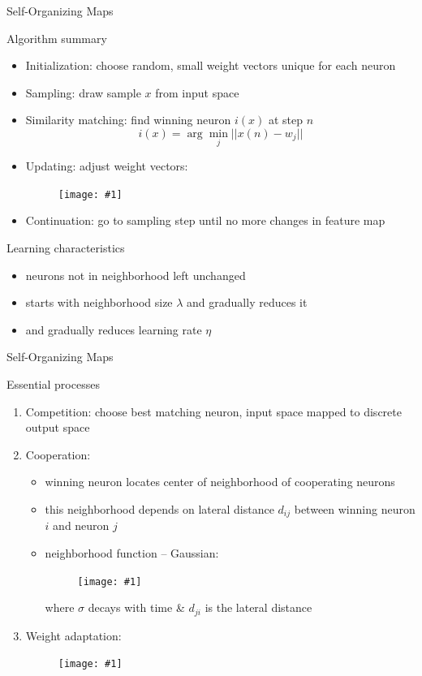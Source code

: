 \documentclass[9pt,t]{beamer}
\newcommand{\picEqHereWidth}[2] { %
    \begin{figure}[htp] 
        \centering
        \texttt{[image: \#1]}
    \end{figure}
}
\begin{document}
\begin{frame}{Self-Organizing Maps}
    \begin{alertblock}{Algorithm summary}
        \begin{itemize}
            \item Initialization: choose random, small weight vectors unique for each neuron
            \item Sampling: draw sample $ x $ from input space
            \item Similarity matching: find winning neuron $ i(x) $ at step $ n $
                \[ i(x) = \arg\min_j ||x(n) - w_j|| \]
            \item Updating: adjust weight vectors:
                \picEqHereWidth{som_weight_update}{0.5\linewidth}
            \item Continuation: go to sampling step until no more changes in feature map
        \end{itemize}
    \end{alertblock}
    \begin{alertblock}{Learning characteristics}
        \begin{itemize}
            \item neurons not in neighborhood left unchanged
            \item starts with neighborhood size $ \lambda $ and gradually reduces it
            \item and gradually reduces learning rate $ \eta $
        \end{itemize}
    \end{alertblock}
\end{frame}

\begin{frame}{Self-Organizing Maps}
    \begin{alertblock}{Essential processes}
        \begin{enumerate}
            \item Competition: choose best matching neuron, input space mapped to discrete output space
            \item Cooperation:
            \begin{itemize}
                \item winning neuron locates center of neighborhood of cooperating neurons
                \item this neighborhood depends on lateral distance $ d_{ij} $ between winning neuron $ i $ and neuron $ j $
                \item neighborhood function -- Gaussian:
                \picEqHereWidth{som_nbh_gaussion}{0.3\linewidth}
                where $ \sigma $ decays with time \& $ d_{ji} $ is the lateral distance
            \end{itemize}
            \item Weight adaptation:
                \picEqHereWidth{som_weight_update2}{0.6\linewidth}
        \end{enumerate}
    \end{alertblock}
\end{frame}
\end{document}
